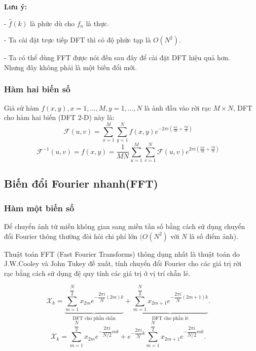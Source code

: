 \documentclass[12pt,a4paper]{report}
\numberwithin{equation}{section}
\theoremstyle{definition} %
\begin{document}
\textbf{Lưu ý:}

- $\hat{f}(k)$ là phức dù cho $f_n$ là thực.

- Ta cài đặt trực tiếp DFT thì có độ phức tạp là $O(N^2)$.

- Ta có thể dùng FFT được nói đến sau đây để cài đặt DFT hiệu quả hơn. Nhưng đây không phải là một biến đổi mới.

\subsubsection{Hàm hai biến số}
Giả sử hàm $f(x,y),x = 1,\ldots,M, y = 1,\ldots,N$ là ảnh đầu vào rời rạc $M\times N$, DFT cho hàm hai biến (DFT 2-D) này là: 
\begin{equation}
\mathcal{F}(u,v) = \sum_{x=1}^{M}\sum_{y=1}^{N} f(x,y)e^{-2\pi i\left(\frac{ux}{M}+\frac{vy}{N}\right)}
\end{equation}
\begin{equation}
\mathcal{F}^{-1}(u,v)=f(x,y) =\dfrac{1}{MN}\sum_{u=1}^{M}\sum_{v=1}^{N} \mathcal{F}(u,v)e^{2\pi i\left(\frac{ux}{M}+\frac{vy}{N}\right)}
\end{equation}

\subsection{Biến đổi Fourier nhanh(FFT)}
\subsubsection{Hàm một biến số}
Để chuyển ảnh từ miền không gian sang miền tần số bằng cách sử dụng chuyển đổi Fourier thông thường đòi hỏi chi phí lớn $(O(N^2)$ với $N$ là số điểm ảnh).

Thuật toán FFT (Fast Fourier Transforms) thông dụng nhất là thuật toán do J.W.Cooley và John Tukey đề xuất, tính chuyển đổi Fourier cho các giá trị rời rạc bằng cách sử dụng đệ quy tính các giá trị ở vị trí chẵn lẻ. 


\begin{equation}
	\label{1314}
\mathcal{X}_k = \underbrace{\sum_{m=1}^{\dfrac{N}{2}}x_{2m}e^{-\dfrac{2\pi i}{N}(2m)k}}_{ \text{DFT cho phần chẵn}} + \underbrace{\sum_{m=1}^{\dfrac{N}{2}}x_{2m+1}e^{-\dfrac{2\pi i}{N}(2m+1)k}}_{\text{DFT cho phần lẻ}}.
\end{equation}
\begin{equation}
	\label{1315}
\mathcal{X}_k = \sum_{m=1}^{\dfrac{N}{2}}x_{2m}e^{-\dfrac{2\pi i}{N/2}mk} + e^{-\dfrac{2\pi i }{N}k}\sum_{m=1}^{\dfrac{N}{2}}x_{2m+1}e^{-\dfrac{2\pi i}{N/2}mk}.
\end{equation}
\end{document}
